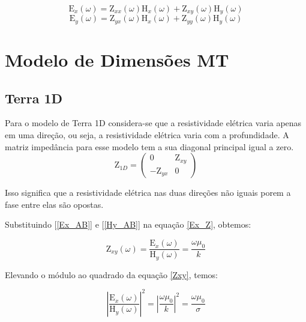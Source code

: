 	    \begin{equation}
	    \label{Ex_Z}
	     \textrm{E}_x (\omega)=\textrm{Z}_{xx}(\omega) \textrm{H}_{x}(\omega) + \textrm{Z}_{xy}(\omega) \textrm{H}_{y}(\omega)
	    \end{equation}
	    \begin{equation}
	    \label{Ey_Z}
	     \textrm{E}_y (\omega)=\textrm{Z}_{yx}(\omega) \textrm{H}_{x}(\omega) + \textrm{Z}_{yy}(\omega) \textrm{H}_{y}(\omega)
	    \end{equation}  
    
    
    \section{Modelo de Dimensões MT}
    
        
        \subsection{Terra 1D}
        
        Para o modelo de Terra 1D considera-se que a resistividade elétrica varia apenas em uma direção, ou seja, a resistividade elétrica varia com a profundidade.        
        A matriz impedância para esse modelo tem a sua diagonal principal igual a zero.
        \begin{equation}
         \textrm{Z}_{1 D} = \left ( \begin{array}{cc}
                                     0 & \textrm{Z}_{xy} \\
                                    -\textrm{Z}_{yx} & 0
                                     \end{array}  \right)
        \end{equation}
        
        Isso significa que a resistividade elétrica nas duas direções não iguais porem a fase entre elas são opostas.
        
        Substituindo [\ref{Ex_AB}] e [\ref{Hy_AB}] na equação \ref{Ex_Z}, obtemos:
        
        \begin{equation}
        \label{Zxy}
         \textrm{Z}_{xy}(\omega) = \dfrac{\textrm{E}_x(\omega)}{\textrm{H}_y(\omega)} = \dfrac{\omega \mu_0}{k}
        \end{equation}
        
        Elevando o módulo ao quadrado da equação \ref{Zxy}, temos:
        
        \begin{equation}
         \left | \dfrac{\textrm{E}_x(\omega)}{\textrm{H}_y(\omega)} \right | ^2 = \left | \dfrac{\omega \mu_0}{k} \right | ^2 = \dfrac{\omega \mu_0}{\sigma}
        \end{equation}
        
